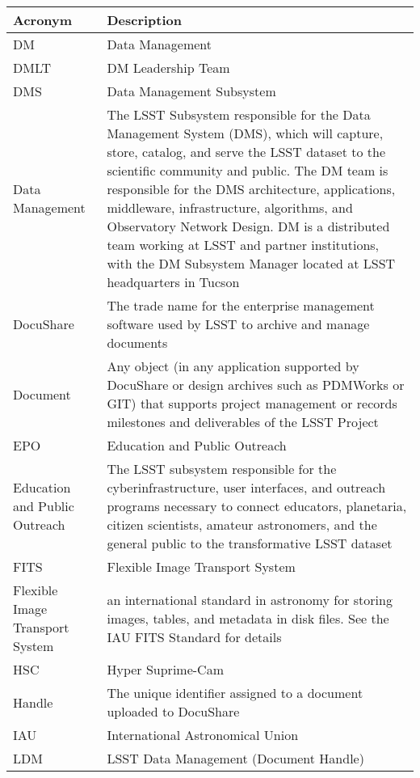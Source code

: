 \addtocounter{table}{-1}
\begin{longtable}{|p{}|p{}|}\hline
\textbf{Acronym} & \textbf{Description}  \\\hline

DM & \gls{Data Management} \\\hline
DMLT & \gls{DM} Leadership Team \\\hline
DMS & \gls{Data Management} \gls{Subsystem} \\\hline
Data Management & The \gls{LSST} Subsystem responsible for the \gls{Data Management} System (\gls{DMS}), which will capture, store, catalog, and serve the \gls{LSST} dataset to the scientific community and public. The DM team is responsible for the \gls{DMS} architecture, applications, middleware, infrastructure, algorithms, and Observatory Network Design. DM is a distributed team working at \gls{LSST} and partner institutions, with the DM \gls{Subsystem Manager} located at \gls{LSST} headquarters in Tucson \\\hline
DocuShare & The trade name for the enterprise management software used by \gls{LSST} to archive and manage documents \\\hline
Document & Any object (in any application supported by \gls{DocuShare} or design archives such as PDMWorks or GIT) that supports project management or records milestones and deliverables of the \gls{LSST} Project \\\hline
EPO & \gls{Education and Public Outreach} \\\hline
Education and Public Outreach & The \gls{LSST} subsystem responsible for the cyberinfrastructure, user interfaces, and outreach programs necessary to connect educators, planetaria, citizen scientists, amateur astronomers, and the general public to the transformative \gls{LSST} dataset \\\hline
FITS & \gls{Flexible Image Transport System} \\\hline
Flexible Image Transport System & an international standard in astronomy for storing images, tables, and \gls{metadata} in disk files. See the \gls{IAU} \gls{FITS} Standard for details \\\hline
HSC & Hyper Suprime-Cam \\\hline
Handle & The unique identifier assigned to a document uploaded to \gls{DocuShare} \\\hline
IAU & International Astronomical Union \\\hline
LDM & \gls{LSST} \gls{Data Management} (\gls{Document} \gls{Handle}) \\\hline

\end{longtable}
